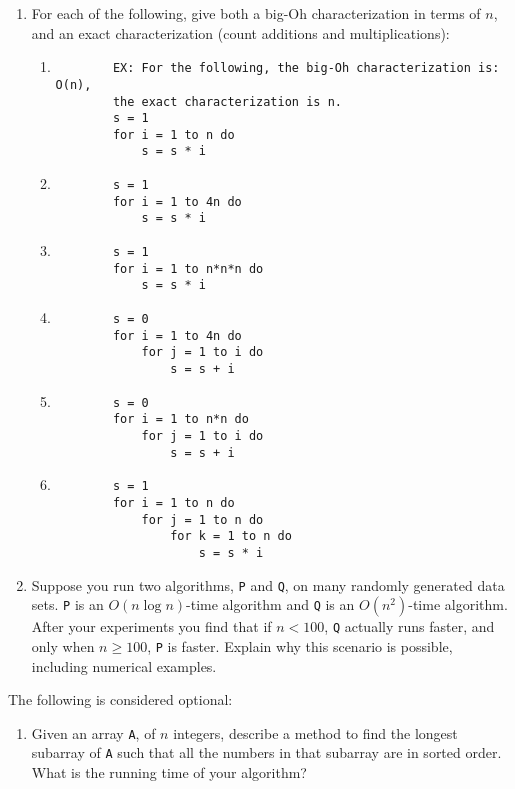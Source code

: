 \documentclass[11pt]{article}
\begin{document}
\begin{enumerate}[leftmargin=*]
    \item For each of the following, give both a big-Oh characterization in terms of $n$, and an exact characterization (count additions and multiplications):
        \begin{enumerate}
        \item
        \begin{verbatim}
        EX: For the following, the big-Oh characterization is: O(n), 
        the exact characterization is n.
        s = 1
        for i = 1 to n do
            s = s * i
        \end{verbatim}
        \item
        \begin{verbatim}
        s = 1
        for i = 1 to 4n do
            s = s * i
        \end{verbatim}
        \item
        \begin{verbatim}
        s = 1
        for i = 1 to n*n*n do
            s = s * i
        \end{verbatim}
        \item
        \begin{verbatim}
        s = 0
        for i = 1 to 4n do
            for j = 1 to i do
                s = s + i
        \end{verbatim}
        \item
        \begin{verbatim}
        s = 0
        for i = 1 to n*n do
            for j = 1 to i do
                s = s + i
        \end{verbatim}
        \item
        \begin{verbatim}
        s = 1
        for i = 1 to n do
            for j = 1 to n do
                for k = 1 to n do
                    s = s * i
        \end{verbatim}
    \end{enumerate}

    \item Suppose you run two algorithms, \verb|P| and \verb|Q|, on many randomly generated data sets.  \verb|P| is an $O(n \log n)$-time algorithm and \verb|Q| is an $O(n^2)$-time algorithm.  After your experiments you find that if $n<100$, \verb|Q| actually runs faster, and only when $n\ge 100$, \verb|P| is faster.  Explain why this scenario is possible, including numerical examples.

\end{enumerate}

The following is considered optional:
\begin{enumerate}
    
    \item Given an array \verb|A|, of $n$ integers, describe a method to find the longest subarray of \verb|A| such that all the numbers in that subarray are in sorted order.  What is the running time of your algorithm?

\end{enumerate}

\label{r:lastpage}
\end{document}
